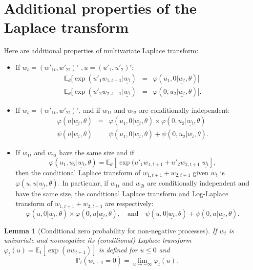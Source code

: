 \documentclass[
  12pt,
]{book}
\newtheorem{lemma}{Lemma}[chapter]
\theoremstyle{definition}
\theoremstyle{definition}
\theoremstyle{definition}
\theoremstyle{definition}
\theoremstyle{remark}
\begin{document}
\hypertarget{additional-properties-of-the-laplace-transform}{%
\section{Additional properties of the Laplace transform}\label{additional-properties-of-the-laplace-transform}}

Here are additional properties of multivariate Laplace transform:

\begin{itemize}
\item
  If \(w_t=(w'_{1t},w'_{2t})'\) \(, u=(u'_1, u'_2)'\):
  \begin{eqnarray*}
  \mathbb{E}_{\theta}[\exp(u'_1 w_{1,t+1}|\underline{w_t})&=&\varphi(u_1,0|\underline{w_t},\theta)] \\
  \mathbb{E}_{\theta}[\exp(u'_2 w
  _{2,t+1}|\underline{w_t})&=&\varphi(0,u_2|\underline{w_t},\theta)].
  \end{eqnarray*}
\item
  If \(w_t=(w'_{1t},w'_{2t})'\), and if \(w_{1t}\) and \(w_{2t}\) are conditionally independent:
  \begin{eqnarray*}
  \varphi(u|\underline{w_t},\theta) &=&
  \varphi(u_1,0|\underline{w_t},\theta)\times\varphi(0,u_2|\underline{w_t},\theta) \\
  \psi(u|\underline{w_t},\theta) &=&
  \psi(u_1,0|\underline{w_t},\theta)+\psi(0,u_2|\underline{w_t},\theta).
  \end{eqnarray*}
\item
  If \(w_{1t}\) and \(w_{2t}\) have the same size and if
  \[
  \varphi(u_1, u_2|\underline{w_t},\theta) = \mathbb{E}_\theta[\exp(u'_1 w_{1, t+1} + u'_2 w_{2,t+1}|\underline{w_t}],
  \]
  then the conditional Laplace transform of \(w_{1, t+1} + w_{2, t+1}\) given
  \(\underline{w_t}\) is \(\varphi(u, u|\underline{w_t},\theta)\).
  In particular, if \(w_{1t}\) and \(w_{2t}\) are conditionally independent and
  have the same size, the conditional Laplace transform and Log-Laplace
  transform of \(w_{1,t+1}+w_{2,t+1}\) are respectively:
  \[
  \varphi(u,0|\underline{w_t},\theta)\times \varphi(0,
  u|\underline{w_t},\theta), \quad \mbox{and}\quad \psi(u,0|\underline{w_t},\theta)+ \psi(0,
  u|\underline{w_t},\theta).
  \]
\end{itemize}

\begin{lemma}[Conditional zero probability for non-negative processes]
\protect\hypertarget{lem:lemMass}{}\label{lem:lemMass}If \(w_t\) is univariate and nonnegative its (conditional)
Laplace transform \(\varphi_t(u) = \mathbb{E}_t[\exp(u w_{t+1})]\) is defined
for \(u \leq 0\) and
\[
\mathbb{P}_t(w_{t+1} = 0) = \lim_{u\rightarrow - \infty} \varphi_t(u).
\]
\end{lemma}
\end{document}
